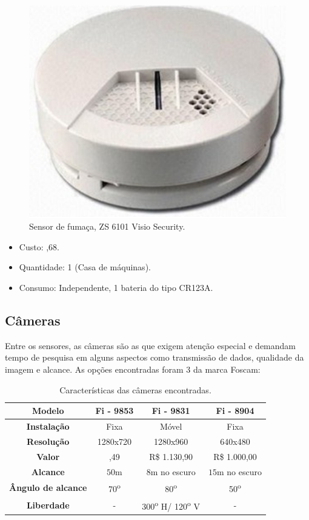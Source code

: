 \begin{figure}[H]
\centering
\includegraphics[width=.4\linewidth,keepaspectratio,angle=0]{figuras/VisioSecurity.eps}
\caption{Sensor de fumaça, ZS 6101 Visio Security.}
\end{figure}

\begin{itemize}
\item Custo: ,68.
\item Quantidade: 1 (Casa de máquinas).
\item Consumo: Independente, 1 bateria do tipo CR123A. 
\end{itemize}

\subsection{Câmeras}
	
	Entre os sensores, as câmeras são as que exigem atenção especial e demandam tempo de pesquisa em alguns aspectos como transmissão de dados, qualidade da imagem e alcance. As opções encontradas foram 3 da marca Foscam:

\begin{table}[H]
\centering
\begin{tabular}{|c|c|c|c|}
\hline 
\textbf{Modelo} & \textbf{Fi - 9853} & \textbf{Fi - 9831} & \textbf{Fi - 8904}\tabularnewline
\hline 
\hline 
\textbf{Instalação} & Fixa & Móvel & Fixa\tabularnewline
\hline 
\textbf{Resolução} & 1280x720 & 1280x960 & 640x480\tabularnewline
\hline 
\textbf{Valor} & \texteuro104,49 & R\$ 1.130,90 & R\$ 1.000,00\tabularnewline
\hline 
\textbf{Alcance} & $50\si{\meter}$ & $8\si{\meter}$ no escuro & $15\si{\meter}$ no escuro\tabularnewline
\hline 
\textbf{Ângulo de alcance} & 70\textsuperscript{o} & 80\textsuperscript{o} & 50\textsuperscript{o}\tabularnewline
\hline 
\textbf{Liberdade} & - & 300\textsuperscript{o} H/ 120\textsuperscript{o} V & -\tabularnewline
\hline 
\end{tabular}
\caption{Características das câmeras encontradas.}
\end{table}

